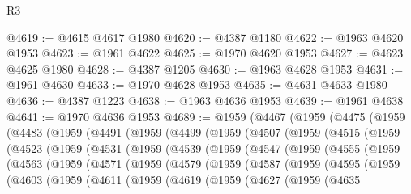 \begin{lexlean}{R3}
\begin{coremodule}
@4619 := @4615 @4617 @1980
@4620 := @4387 @1180
@4622 := @1963 @4620 @1953
@4623 := @1961 @4622
@4625 := @1970 @4620 @1953
@4627 := @4623 @4625 @1980
@4628 := @4387 @1205
@4630 := @1963 @4628 @1953
@4631 := @1961 @4630
@4633 := @1970 @4628 @1953
@4635 := @4631 @4633 @1980
@4636 := @4387 @1223
@4638 := @1963 @4636 @1953
@4639 := @1961 @4638
@4641 := @1970 @4636 @1953
@4689 := @1959
    (@4467
      (@1959
        (@4475
          (@1959
            (@4483
              (@1959
                (@4491
                  (@1959
                    (@4499
                      (@1959
                        (@4507
                          (@1959
                            (@4515
                              (@1959
                                (@4523
                                  (@1959
                                    (@4531
                                      (@1959
                                        (@4539
                                          (@1959
                                            (@4547
                                              (@1959
                                                (@4555
                                                  (@1959
                                                    (@4563
                                                      (@1959
                                                        (@4571
                                                          (@1959
                                                            (@4579
                                                              (@1959
                                                                (@4587
                                                                  (@1959
                                                                    (@4595
                                                                      (@1959
                                                                        (@4603
                                                                          (@1959
                                                                            (@4611
                                                                              (@1959
                                                                                (@4619
                                                                                  (@1959
                                                                                    (@4627
                                                                                      (@1959
                                                                                        (@4635

\end{coremodule}
\end{lexlean}
